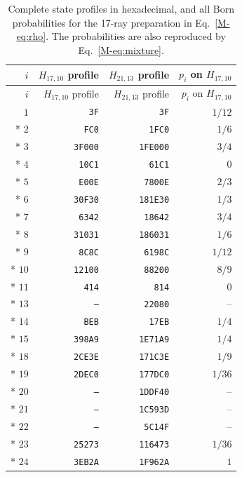 \documentclass[aps,pra,reprint,superscriptaddress,longbibliography,nofootinbib,floatfix,10pt]{revtex4-2}
\theoremstyle{definition}
\begin{document}
\begingroup\small\setlength{\LTpre}{6pt}\setlength{\LTpost}{8pt}
\begin{longtable}{rrrr}
\caption{Complete state profiles in hexadecimal, and all Born probabilities for the 17-ray preparation in Eq.~\eqref{M-eq:rho}. The probabilities are also reproduced by Eq.~\eqref{M-eq:mixture}.}\label{tab:profiles}\\
\toprule $i$ & $H_{17,10}$ profile & $H_{21,13}$ profile & $p_i$ on $H_{17,10}$\\\midrule
\endfirsthead
\toprule $i$ & $H_{17,10}$ profile & $H_{21,13}$ profile & $p_i$ on $H_{17,10}$\\\midrule
\endhead
\bottomrule\endfoot
$1$ & \texttt{3F} & \texttt{3F} & $1/12$ \\*
$2$ & \texttt{FC0} & \texttt{1FC0} & $1/6$ \\*
$3$ & \texttt{3F000} & \texttt{1FE000} & $3/4$ \\*
$4$ & \texttt{10C1} & \texttt{61C1} & $0$ \\*
$5$ & \texttt{E00E} & \texttt{7800E} & $2/3$ \\*
$6$ & \texttt{30F30} & \texttt{181E30} & $1/3$ \\*
$7$ & \texttt{6342} & \texttt{18642} & $3/4$ \\*
$8$ & \texttt{31031} & \texttt{186031} & $1/6$ \\*
$9$ & \texttt{8C8C} & \texttt{6198C} & $1/12$ \\*
$10$ & \texttt{12100} & \texttt{88200} & $8/9$ \\*
$11$ & \texttt{414} & \texttt{814} & $0$ \\*
$13$ & \texttt{--} & \texttt{22080} & -- \\*
$14$ & \texttt{BEB} & \texttt{17EB} & $1/4$ \\*
$15$ & \texttt{398A9} & \texttt{1E71A9} & $1/4$ \\*
$18$ & \texttt{2CE3E} & \texttt{171C3E} & $1/9$ \\*
$19$ & \texttt{2DEC0} & \texttt{177DC0} & $1/36$ \\*
$20$ & \texttt{--} & \texttt{1DDF40} & -- \\*
$21$ & \texttt{--} & \texttt{1C593D} & -- \\*
$22$ & \texttt{--} & \texttt{5C14F} & -- \\*
$23$ & \texttt{25273} & \texttt{116473} & $1/36$ \\*
$24$ & \texttt{3EB2A} & \texttt{1F962A} & $1$ \\
\end{longtable}\endgroup
\end{document}
